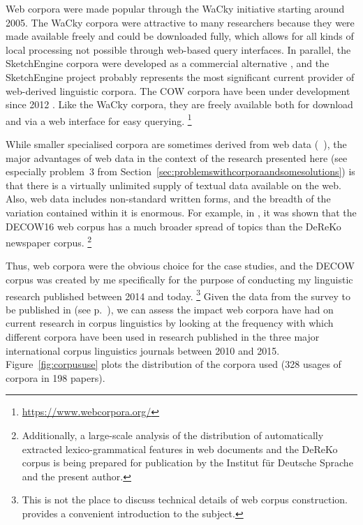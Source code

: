 Web corpora were made popular through the WaCky initiative \citep{BaroniEa2009} starting around 2005.
The WaCky corpora were attractive to many researchers because they were made available freely and could be downloaded fully, which allows for all kinds of local processing not possible through web-based query interfaces.
In parallel, the SketchEngine corpora were developed as a commercial alternative \citep{KilgarriffEa2014}, and the SketchEngine project probably represents the most significant current provider of web-derived linguistic corpora.
The COW corpora have been under development since 2012 \citep{SchaeferBildhauer2012,SchaeferEa2013,SchaeferBildhauer2013,Schaefer2015b,BildhauerSchaefer2016,Schaefer2016a,Schaefer2017,BildhauerSchaefer2017}.
Like the WaCky corpora, they are freely available both for download and via a web interface for easy querying.%
\footnote{\url{https://www.webcorpora.org/}}

While smaller specialised corpora are sometimes derived from web data (\eeg\ \citealt{Krause2016}), the major advantages of web data in the context of the research presented here (see especially problem~3 from Section~\ref{sec:problemswithcorporaandsomesolutions}) is that there is a virtually unlimited supply of textual data available on the web.
Also, web data includes non-standard written forms, and the breadth of the variation contained within it is enormous.
For example, in \citet{BildhauerSchaefer2016,BildhauerSchaefer2017}, it was shown that the DECOW16 web corpus has a much broader spread of topics than the DeReKo newspaper corpus.%
\footnote{Additionally, a large-scale analysis of the distribution of automatically extracted lexico-grammatical features in web documents and the DeReKo corpus is being prepared for publication by the Institut für Deutsche Sprache and the present author.}

Thus, web corpora were the obvious choice for the case studies, and the DECOW corpus was created by me specifically for the purpose of conducting my linguistic research published between 2014 and today.%
\footnote{This is not the place to discuss technical details of web corpus construction.
  \citet{SchaeferBildhauer2013} provides a convenient introduction to the subject.}
Given the data from the survey to be published in \citet{Schaefer2019} (see p.~\pageref{abs:survey}), we can assess the impact web corpora have had on current research in corpus linguistics by looking at the frequency with which different corpora have been used in research published in the three major international corpus linguistics journals between 2010 and 2015.
Figure~\ref{fig:corpususe} plots the distribution of the corpora used (328 usages of corpora in 198 papers).

